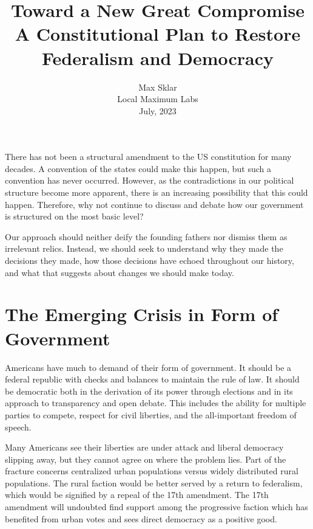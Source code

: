 \documentclass{article}
\begin{document}
\parindent=0in
\parskip=12pt

\title{
  Toward a New Great Compromise\\
  \large{
    A Constitutional Plan to Restore Federalism and Democracy
  }
}

\author{Max Sklar\\ Local Maximum Labs \\ July, 2023}
\date{}

\maketitle
\thispagestyle{empty}

There has not been a structural amendment to the US constitution for many decades. A convention of the states could make this happen, but such a convention has never occurred. However, as the contradictions in our political structure become more apparent, there is an increasing possibility that this could happen. Therefore, why not continue to discuss and debate how our government is structured on the most basic level?

Our approach should neither deify the founding fathers nor dismiss them as irrelevant relics. Instead, we should seek to understand why they made the decisions they made, how those decisions have echoed throughout our history, and what that suggests about changes we should make today.

\section{The Emerging Crisis in Form of Government}

Americans have much to demand of their form of government. It should be a federal republic with checks and balances to maintain the rule of law. It should be democratic both in the derivation of its power through elections and in its approach to transparency and open debate. This includes the ability for multiple parties to compete, respect for civil liberties, and the all-important freedom of speech.

Many Americans see their liberties are under attack and liberal democracy slipping away, but they cannot agree on where the problem lies. Part of the fracture concerns centralized urban populations versus widely distributed rural populations. The rural faction would be better served by a return to federalism, which would be signified by a repeal of the 17th amendment\cite{Tucker}\cite{Virginia}. The 17th amendment will undoubted find support among the progressive faction which has benefited from urban votes and sees direct democracy as a positive good\cite{Smith}.
\end{document}
